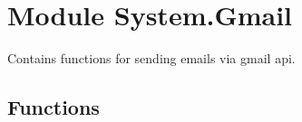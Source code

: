 %
%
%


\section{Module System.Gmail}

    \label{System:Gmail}
Contains functions for sending emails via gmail api.



  \subsection{Functions}

    \label{System:Gmail:Gmail}

    \vspace{0.5ex}

